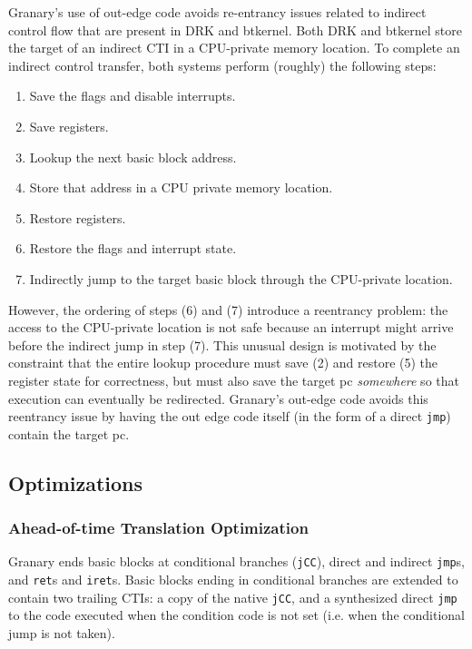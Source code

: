 \documentclass[preprint]{sigplanconf}
\begin{document}
Granary's use of out-edge code avoids re-entrancy issues related to indirect control flow that are present in DRK and btkernel. Both DRK and btkernel store the target of an indirect CTI in a CPU-private memory location. To complete an indirect control transfer, both systems perform (roughly) the following steps: \begin{enumerate}[itemindent=\parindent]%
\setlength{\itemsep}{2pt}%
\setlength{\parskip}{0pt}%
	\item Save the flags and disable interrupts.
	\item Save registers.
	\item Lookup the next basic block address.
	\item Store that address in a CPU private memory location.
	\item Restore registers.
	\item Restore the flags and interrupt state.
	\item Indirectly jump to the target basic block through the CPU-private location.
\end{enumerate} %
However, the ordering of steps (6) and (7) introduce a reentrancy problem: the access to the CPU-private location is not safe because an interrupt might arrive before the indirect jump in step (7). This unusual design is motivated by the constraint that the entire lookup procedure must save (2) and restore (5) the register state for correctness, but must also save the target pc \emph{somewhere} so that execution can eventually be redirected. Granary's out-edge code avoids this reentrancy issue by having the out edge code itself (in the form of a direct \texttt{jmp}) contain the target pc.

\subsection{Optimizations}\label{sec:optimize}

\subsubsection{Ahead-of-time Translation Optimization} \label{sec:aot}
Granary ends basic blocks at conditional branches (\texttt{jCC}), direct and indirect \texttt{jmp}s, and \texttt{ret}s and \texttt{iret}s. Basic blocks ending in conditional branches are extended to contain two trailing CTIs: a copy of the native \texttt{jCC}, and a synthesized direct \texttt{jmp} to the code executed when the condition code is not set (i.e. when the conditional jump is not taken).
\end{document}
